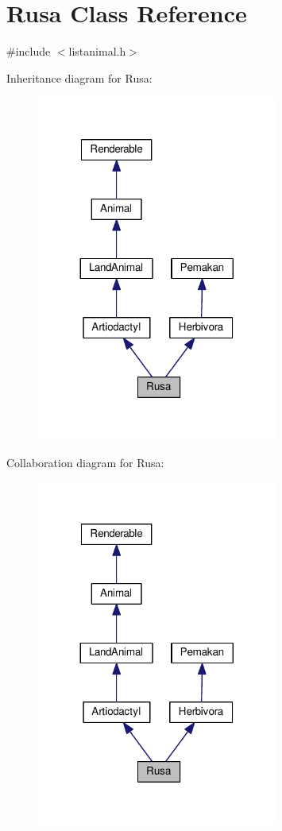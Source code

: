 \hypertarget{classRusa}{}\section{Rusa Class Reference}
\label{classRusa}


{\ttfamily \#include $<$listanimal.\+h$>$}



Inheritance diagram for Rusa\+:
\nopagebreak
\begin{figure}[H]
\begin{center}
\leavevmode
\includegraphics[width=224pt]{classRusa__inherit__graph}
\end{center}
\end{figure}


Collaboration diagram for Rusa\+:
\nopagebreak
\begin{figure}[H]
\begin{center}
\leavevmode
\includegraphics[width=224pt]{classRusa__coll__graph}
\end{center}
\end{figure}
